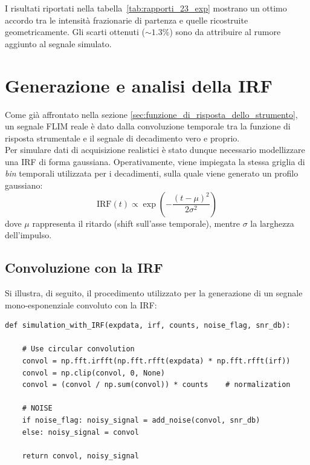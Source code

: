 I risultati riportati nella tabella~\ref{tab:rapporti_23_exp} mostrano un ottimo accordo tra le intensità frazionarie di partenza e quelle ricostruite geometricamente. Gli scarti ottenuti ($\sim 1.3\%$) sono da attribuire al rumore aggiunto al segnale simulato.\\




\section{Generazione e analisi della IRF}
\label{sec:generazione_analisi_IRF}

Come già affrontato nella sezione \ref{sec:funzione_di_risposta_dello_strumento}, un segnale FLIM reale è dato dalla convoluzione temporale tra la funzione di risposta strumentale e il segnale di decadimento vero e proprio.\\
Per simulare dati di acquisizione realistici è stato dunque necessario modellizzare una IRF di forma gaussiana. Operativamente, viene impiegata la stessa griglia di \textit{bin} temporali utilizzata per i decadimenti, sulla quale viene generato un profilo gaussiano:
\begin{equation*}
    \text{IRF}(t) \propto \exp\left(-\frac{(t - \mu)^2}{2\sigma^2}\right)
\end{equation*}
dove $\mu$ rappresenta il ritardo (shift sull'asse temporale), mentre $\sigma$ la larghezza dell'impulso.

\subsection{Convoluzione con la IRF}
\label{sec:convoluzione_con_la_IRF}

Si illustra, di seguito, il procedimento utilizzato per la generazione di un segnale mono-esponenziale convoluto con la IRF:
\begin{verbatim}
def simulation_with_IRF(expdata, irf, counts, noise_flag, snr_db): 

    # Use circular convolution 
    convol = np.fft.irfft(np.fft.rfft(expdata) * np.fft.rfft(irf))
    convol = np.clip(convol, 0, None)
    convol = (convol / np.sum(convol)) * counts    # normalization
    
    # NOISE
    if noise_flag: noisy_signal = add_noise(convol, snr_db) 
    else: noisy_signal = convol
    
    return convol, noisy_signal
\end{verbatim}    

